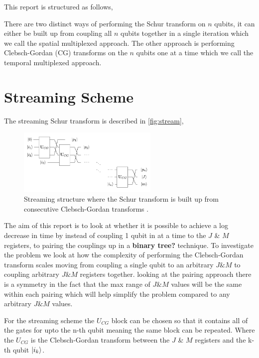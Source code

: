 \documentclass[12pt]{article}
\begin{document}
This report is structured as follows,   

There are two distinct ways of performing the Schur transform on $n$ qubits, it can either be built up from 
coupling all $n$ qubits together in a single iteration which we call the spatial multiplexed approach. The
other approach is performing Clebsch-Gordan (CG) transforms on the $n$ qubits one at a time which we call the
temporal multiplexed approach.  


\section{Streaming Scheme}

The streaming Schur transform is described in \autoref{fig:stream},

\begin{figure}[h!]
\centering
\includegraphics[width=0.6\textwidth]{schurcascade.png}
\caption{Streaming structure where the Schur transform is built up from consecutive Clebsch-Gordan transforms \cite{bacon2006efficient}.}
\label{fig:stream}
\end{figure}

The aim of this report is to look at whether it is possible to achieve a log decrease in time by instead of
coupling 1 qubit in at a time to the $J$ \& $M$ registers, to pairing the couplings up in a
\textbf{binary tree?} technique. To investigate the problem we look at how the complexity of performing the
Clebsch-Gordan transform scales moving from coupling a single qubit to an arbitrary $J \& M$ to coupling
arbitrary $J \& M$ registers together. looking at the pairing approach there is a symmetry in the fact that
the max range of $J \& M$ values will be the same within each pairing which will help simplify the problem
compared to any arbitrary $J \& M$ values.

For the streaming scheme the $U_{CG}$ block can be chosen so that it contains all of the gates for upto the n-th qubit meaning the same block can be repeated. 
Where the $U_{CG}$ is the Clebsch-Gordan transform between the $J$ \& $M$ registers and the k-th qubit $\left\vert{i_k}\right\rangle$.
\end{document}
